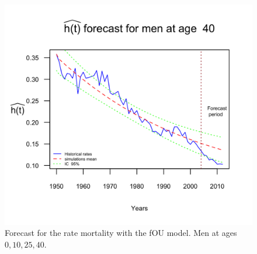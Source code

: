 \documentclass[smallextended]{svjour3}
\begin{document}
\begin{figure}[H]
    \includegraphics{PlotMenForecast40.png}
    \caption{Forecast for the rate mortality with the fOU model. Men at ages
    $0,10,25,40$.}
    \label{graph-forecast_men_FOU1}
\end{figure}\vspace*{0.1cm}
\end{document}

